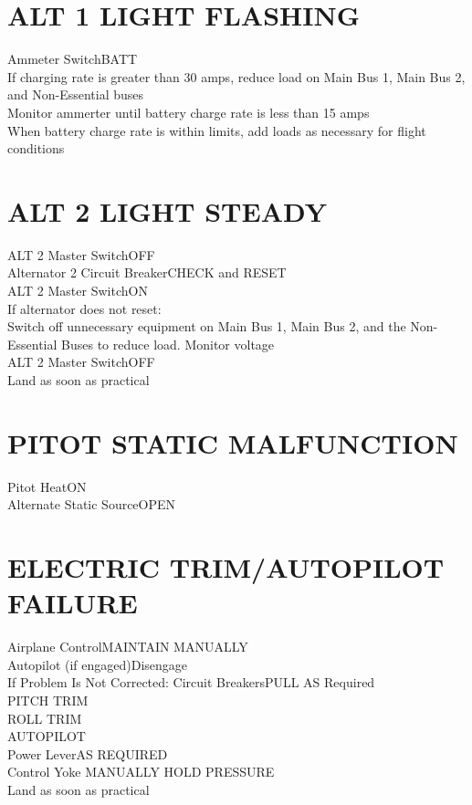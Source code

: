 \documentclass{article}
\begin{document}
\begin{multicols*}{2}
\section*{ALT 1 LIGHT FLASHING}
Ammeter Switch\dotfill BATT\\
If charging rate is greater than 30 amps, reduce load on Main Bus 1, Main Bus 2, and Non-Essential buses\\
Monitor ammerter until battery charge rate is less than 15 amps\\
When battery charge rate is within limits, add loads as necessary for flight conditions
\section*{ALT 2 LIGHT STEADY}
ALT 2 Master Switch\dotfill OFF\\
Alternator 2 Circuit Breaker\dotfill CHECK and RESET\\
ALT 2 Master Switch\dotfill ON\\
If alternator does not reset:\\
Switch off unnecessary equipment on Main Bus 1, Main Bus 2, and the Non-Essential Buses to reduce load. Monitor voltage\\
ALT 2 Master Switch\dotfill OFF\\
Land as soon as practical
\section*{PITOT STATIC MALFUNCTION}
Pitot Heat\dotfill ON\\
Alternate Static Source\dotfill OPEN
\section*{ELECTRIC TRIM/AUTOPILOT FAILURE}
Airplane Control\dotfill MAINTAIN MANUALLY\\
Autopilot (if engaged)\dotfill Disengage\\
If Problem Is Not Corrected:
Circuit Breakers\dotfill PULL AS Required\\
\hspace*{6mm} PITCH TRIM\\
\hspace*{6mm} ROLL TRIM\\
\hspace*{6mm} AUTOPILOT\\
Power Lever\dotfill AS REQUIRED\\
Control Yoke \dotfill MANUALLY HOLD PRESSURE\\
Land as soon as practical
\end{multicols*}
\end{document}
